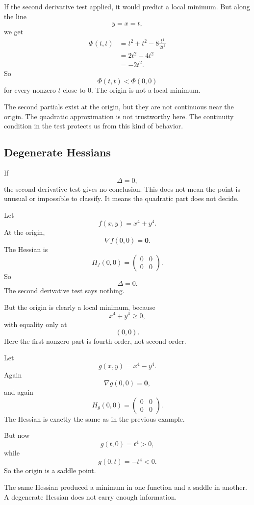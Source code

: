 If the second derivative test applied, it would predict a local minimum.  But along
the line
\[
    y=x=t,
\]
we get
\[
\begin{aligned}
    \Phi(t,t)
    &=
    t^2+t^2-8\frac{t^4}{2t^2}\\
    &=
    2t^2-4t^2\\
    &=
    -2t^2.
\end{aligned}
\]
So
\[
    \Phi(t,t)<\Phi(0,0)
\]
for every nonzero \(t\) close to \(0\).  The origin is not a local minimum.

The second partials exist at the origin, but they are not continuous near the origin.
The quadratic approximation is not trustworthy here.  The continuity condition in the
test protects us from this kind of behavior.

\subsection{Degenerate Hessians}

If
\[
    \Delta=0,
\]
the second derivative test gives no conclusion.  This does not mean the point is
unusual or impossible to classify.  It means the quadratic part does not decide.

\begin{example}
Let
\[
    f(x,y)=x^4+y^4.
\]
At the origin,
\[
    \nabla f(0,0)=\mathbf 0.
\]
The Hessian is
\[
    H_f(0,0)=
    \begin{pmatrix}
        0&0\\
        0&0
    \end{pmatrix}.
\]
So
\[
    \Delta=0.
\]
The second derivative test says nothing.

But the origin is clearly a local minimum, because
\[
    x^4+y^4\ge0,
\]
with equality only at
\[
    (0,0).
\]
Here the first nonzero part is fourth order, not second order.
\end{example}

\begin{example}
Let
\[
    g(x,y)=x^4-y^4.
\]
Again
\[
    \nabla g(0,0)=\mathbf 0,
\]
and again
\[
    H_g(0,0)=
    \begin{pmatrix}
        0&0\\
        0&0
    \end{pmatrix}.
\]
The Hessian is exactly the same as in the previous example.

But now
\[
    g(t,0)=t^4>0,
\]
while
\[
    g(0,t)=-t^4<0.
\]
So the origin is a saddle point.

The same Hessian produced a minimum in one function and a saddle in another.  A
degenerate Hessian does not carry enough information.
\end{example}

